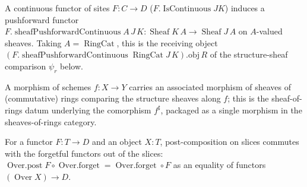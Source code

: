 \begin{lemma}
  \label{mk-lem:sheafPushforwardContinuous_mathlib}
  \mathlibok

  A continuous functor of sites \(F : C \to D\) (\(F.\operatorname{IsContinuous} J K\)) induces a
  pushforward functor \(F.\operatorname{sheafPushforwardContinuous} A\,J\,K : \operatorname{Sheaf}
  K\,A \to \operatorname{Sheaf} J\,A\) on \(A\)-valued sheaves. Taking \(A = \operatorname{RingCat}\),
  this is the receiving object \((F.\operatorname{sheafPushforwardContinuous} \operatorname{RingCat}
  J\,K).\mathrm{obj}\,R\) of the structure-sheaf comparison \(\psi_r\) below.
\end{lemma}

\begin{lemma}
  \label{mk-lem:scheme_hom_toRingCatSheafHom_mathlib}
  \mathlibok

  A morphism of schemes \(f : X \to Y\) carries an associated morphism of sheaves of (commutative)
  rings comparing the structure sheaves along \(f\); this is the sheaf-of-rings datum underlying the
  comorphism \(f^\sharp\), packaged as a single morphism in the sheaves-of-rings category.
\end{lemma}

\begin{lemma}
  \label{mk-lem:over_post_forget_mathlib}
  \mathlibok

  For a functor \(F : T \to D\) and an object \(X : T\), post-composition on slices commutes with the
  forgetful functors out of the slices: \(\operatorname{Over.post} F \circ \operatorname{Over.forget} =
  \operatorname{Over.forget} \circ F\) as an equality of functors \((\operatorname{Over} X) \to D\).
\end{lemma}

